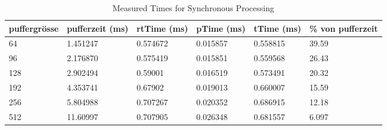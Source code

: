 \begin{table}[H]
\begin{center}
\begin{tabular}{ |p{1.4cm}||p{1.5cm}|p{1.7cm}|p{1.7cm}|p{1.6cm}|p{1.4cm}|  }
 \hline
 puffergrösse    & pufferzeit (ms)    & rtTime (ms)   & pTime (ms)    & tTime (ms) & \% von pufferzeit\\
 \hline
 64             & 1.451247      & 0.574672          & 0.015857          & 0.558815      & 39.59 \\
 96             & 2.176870      & 0.575419          & 0.015851          & 0.559568      & 26.43 \\
 128            & 2.902494      & 0.59001           & 0.016519          & 0.573491      & 20.32 \\
 192            & 4.353741      & 0.67902           & 0.019013          & 0.660007      & 15.59 \\
 256            & 5.804988      & 0.707267          & 0.020352          & 0.686915      & 12.18 \\
 512            & 11.60997      & 0.707905          & 0.026348          & 0.681557      & 6.097 \\
 \hline
\end{tabular}
\end{center}
\caption{Measured Times for Synchronous Processing}
\label{tab:latency_comp}
\end{table}